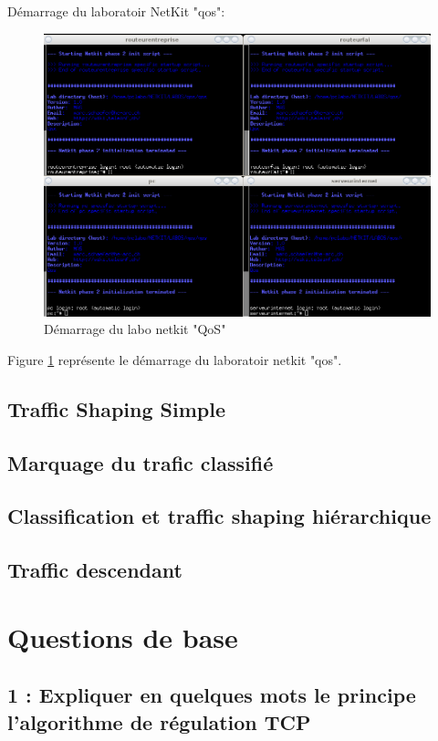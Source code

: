 \documentclass{article}
\begin{document}
Démarrage du laboratoir NetKit "qos":
\begin{figure}
  \includegraphics[width=\linewidth]{./captures/1-start.png}
  \caption{Démarrage du labo netkit "QoS"}
  \label{fig:qos}
\end{figure}

Figure \ref{fig:qos} représente le démarrage du laboratoir netkit "qos".

\newpage

\subsection{Traffic Shaping Simple}


\subsection{Marquage du trafic classifié}

\subsection{Classification et traffic shaping hiérarchique}

\subsection{Traffic descendant}

\section{Questions de base}

\subsection*{1 : Expliquer en quelques mots le principe l'algorithme de régulation TCP}
\end{document}
